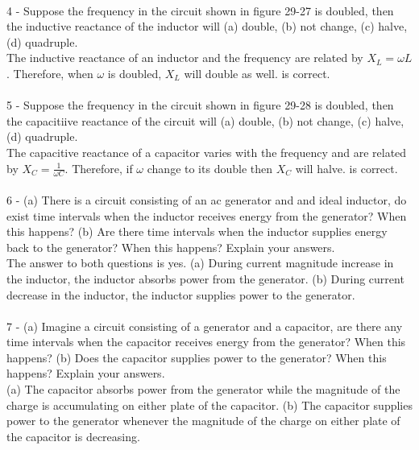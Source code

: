 \documentclass{report}
\begin{document}
\paragraph{}
4 - Suppose the frequency in the circuit shown in figure 29-27 is doubled, then the inductive reactance of the inductor will (a) double, (b) not change, (c) halve, (d) quadruple.\\
The inductive reactance of an inductor and the frequency are related by $X_L = \omega L$. Therefore, when $\omega$ is doubled, $X_L$ will double as well.  is correct.

\paragraph{}
5 - Suppose the frequency in the circuit shown in figure 29-28 is doubled, then the capacitiive reactance of the circuit will (a) double, (b) not change, (c) halve, (d) quadruple.\\
The capacitive reactance of a capacitor varies with the frequency and are related by $X_C = \frac{1}{\omega C}$. Therefore, if $\omega$ change to its double then $X_C$ will halve.  is correct.

\paragraph{}
6 - (a) There is a circuit consisting of an ac generator and and ideal inductor, do exist time intervals when the inductor receives energy from the generator? When this happens? (b) Are there time intervals when the inductor supplies energy back to the generator? When this happens? Explain your answers.\\
The answer to both questions is yes. (a) During current magnitude increase in the inductor, the inductor absorbs power from the generator. (b) During current decrease in the inductor, the inductor supplies power to the generator.

\paragraph{}
7 - (a) Imagine a circuit consisting of a generator and a capacitor, are there any time intervals when the capacitor receives energy from the generator? When this happens? (b) Does the capacitor supplies power to the generator? When this happens? Explain your answers.\\
(a) The capacitor absorbs power from the generator while the magnitude of the charge is accumulating on either plate of the capacitor. (b) The capacitor supplies power to the generator whenever the magnitude of the charge on either plate of the capacitor is decreasing. 
\end{document}
